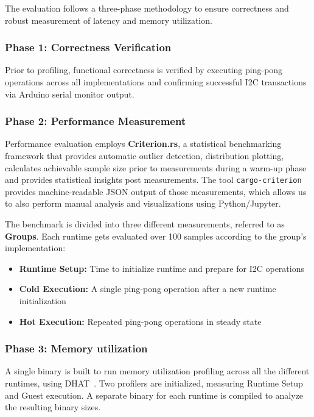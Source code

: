 The evaluation follows a three-phase methodology to ensure correctness and robust measurement of latency and memory utilization.

\subsubsection{Phase 1: Correctness Verification}
Prior to profiling, functional correctness is verified by executing ping-pong operations across all implementations and confirming successful I2C transactions via Arduino serial monitor output.

\subsubsection{Phase 2: Performance Measurement}
Performance evaluation employs \textbf{Criterion.rs}, a statistical benchmarking framework that provides automatic outlier detection, distribution plotting, calculates achievable sample size prior to measurements during a warm-up phase and provides statistical insights post measurements\cite{criterion_rs}. The tool \texttt{cargo-criterion} provides machine-readable JSON output of those measurements, which allows us to also perform manual analysis and visualizations using Python/Jupyter.

The benchmark is divided into three different measurements, referred to as \textbf{Groups}. Each runtime gets evaluated over 100 samples according to the group's implementation:
\begin{itemize}
    \item \textbf{Runtime Setup:} Time to initialize runtime and prepare for I2C operations
    \item \textbf{Cold Execution:} A single ping-pong operation after a new runtime initialization
    \item \textbf{Hot Execution:} Repeated ping-pong operations in steady state
\end{itemize}

\subsubsection{Phase 3: Memory utilization}
A single binary is built to run memory utilization profiling across all the different runtimes, using DHAT~\cite{dhat_crate}. Two profilers are initialized, measuring Runtime Setup and Guest execution. A separate binary for each runtime is compiled to analyze the resulting binary sizes.

